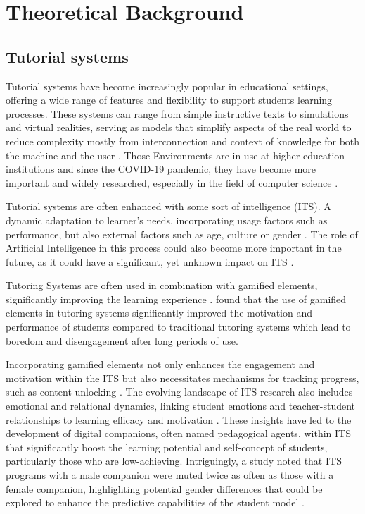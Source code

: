 \section{Theoretical Background}

\subsection{Tutorial systems}
Tutorial systems have become increasingly popular in educational settings, offering a wide range of features and flexibility to support students learning processes.
These systems can range from simple instructive texts to simulations and virtual realities, serving as models that simplify aspects of the real world to reduce complexity mostly from interconnection and context of knowledge for both the machine and the user \parencite{psotkaIntelligentTutoringSystems1988}.
Those Environments are in use at higher education institutions and since the COVID-19 pandemic, they have become more important \parencite{elhadbiReviewStudyAdaptive2024} and widely researched, especially in the field of computer science \parencite{zawacki-richterSystematicReviewResearch2019}.

Tutorial systems are often enhanced with some sort of intelligence (ITS). A dynamic adaptation to learner's needs, incorporating usage factors such as performance, but also external factors such as age, culture or gender \parencite{nkambouAdvancesIntelligentTutoring2010, gonzalezGamificationIntelligentTutoring2014}.
The role of Artificial Intelligence in this process could also become more important in the future, as it could have a significant, yet unknown impact on ITS \parencite{zawacki-richterSystematicReviewResearch2019}.

Tutoring Systems are often used in combination with gamified elements, significantly improving the learning experience \parencite{dermevalGaTOOntologicalModel2019}.
\textcite{jacksonMotivationPerformanceGamebased2013} found that the use of gamified elements in tutoring systems significantly improved the motivation and performance of students compared to traditional tutoring systems which lead to boredom and disengagement after long periods of use.

Incorporating gamified elements not only enhances the engagement and motivation within the ITS but also necessitates mechanisms for tracking progress, such as content unlocking \parencite{gonzalezGamificationIntelligentTutoring2014}.
The evolving landscape of ITS research also includes emotional and relational dynamics, linking student emotions and teacher-student relationships to learning efficacy and motivation \parencite{woolfAffectiveTutorsAutomatic2010}.
These insights have led to the development of digital companions, often named pedagogical agents, within ITS that significantly boost the learning potential and self-concept of students, particularly those who are low-achieving.
Intriguingly, a study noted that ITS programs with a male companion were muted twice as often as those with a female companion, highlighting potential gender differences that could be explored to enhance the predictive capabilities of the student model \parencite{woolfAffectiveTutorsAutomatic2010}.

